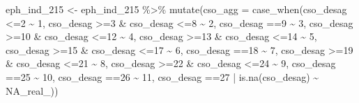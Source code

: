 \documentclass[
]{book}
\newenvironment{Shaded}{\begin{snugshade}}{\end{snugshade}}
\newcommand{\AttributeTok}[1]{\textcolor[rgb]{0.77,0.63,0.00}{#1}}
\newcommand{\ConstantTok}[1]{\textcolor[rgb]{0.00,0.00,0.00}{#1}}
\newcommand{\DecValTok}[1]{\textcolor[rgb]{0.00,0.00,0.81}{#1}}
\newcommand{\FunctionTok}[1]{\textcolor[rgb]{0.00,0.00,0.00}{#1}}
\newcommand{\NormalTok}[1]{#1}
\newcommand{\OtherTok}[1]{\textcolor[rgb]{0.56,0.35,0.01}{#1}}
\newcommand{\SpecialCharTok}[1]{\textcolor[rgb]{0.00,0.00,0.00}{#1}}
\begin{document}
\begin{Shaded}
\begin{Highlighting}[]
\NormalTok{eph\_ind\_215 }\OtherTok{\textless{}{-}}\NormalTok{ eph\_ind\_215 }\SpecialCharTok{\%\textgreater{}\%} 
  \FunctionTok{mutate}\NormalTok{(}\AttributeTok{cso\_agg =} \FunctionTok{case\_when}\NormalTok{(cso\_desag }\SpecialCharTok{\textless{}=}\DecValTok{2} \SpecialCharTok{\textasciitilde{}} \DecValTok{1}\NormalTok{,}
\NormalTok{                             cso\_desag }\SpecialCharTok{\textgreater{}=}\DecValTok{3} \SpecialCharTok{\&}\NormalTok{ cso\_desag }\SpecialCharTok{\textless{}=}\DecValTok{8} \SpecialCharTok{\textasciitilde{}} \DecValTok{2}\NormalTok{,}
\NormalTok{                             cso\_desag }\SpecialCharTok{==}\DecValTok{9} \SpecialCharTok{\textasciitilde{}} \DecValTok{3}\NormalTok{,}
\NormalTok{                             cso\_desag }\SpecialCharTok{\textgreater{}=}\DecValTok{10} \SpecialCharTok{\&}\NormalTok{ cso\_desag }\SpecialCharTok{\textless{}=}\DecValTok{12} \SpecialCharTok{\textasciitilde{}} \DecValTok{4}\NormalTok{,}
\NormalTok{                             cso\_desag }\SpecialCharTok{\textgreater{}=}\DecValTok{13} \SpecialCharTok{\&}\NormalTok{ cso\_desag }\SpecialCharTok{\textless{}=}\DecValTok{14} \SpecialCharTok{\textasciitilde{}} \DecValTok{5}\NormalTok{,}
\NormalTok{                             cso\_desag }\SpecialCharTok{\textgreater{}=}\DecValTok{15} \SpecialCharTok{\&}\NormalTok{ cso\_desag }\SpecialCharTok{\textless{}=}\DecValTok{17} \SpecialCharTok{\textasciitilde{}} \DecValTok{6}\NormalTok{,}
\NormalTok{                             cso\_desag }\SpecialCharTok{==}\DecValTok{18} \SpecialCharTok{\textasciitilde{}} \DecValTok{7}\NormalTok{,}
\NormalTok{                             cso\_desag }\SpecialCharTok{\textgreater{}=}\DecValTok{19} \SpecialCharTok{\&}\NormalTok{ cso\_desag }\SpecialCharTok{\textless{}=}\DecValTok{21} \SpecialCharTok{\textasciitilde{}} \DecValTok{8}\NormalTok{,}
\NormalTok{                             cso\_desag }\SpecialCharTok{\textgreater{}=}\DecValTok{22} \SpecialCharTok{\&}\NormalTok{ cso\_desag }\SpecialCharTok{\textless{}=}\DecValTok{24} \SpecialCharTok{\textasciitilde{}} \DecValTok{9}\NormalTok{,}
\NormalTok{                             cso\_desag }\SpecialCharTok{==}\DecValTok{25} \SpecialCharTok{\textasciitilde{}} \DecValTok{10}\NormalTok{,}
\NormalTok{                             cso\_desag }\SpecialCharTok{==}\DecValTok{26} \SpecialCharTok{\textasciitilde{}} \DecValTok{11}\NormalTok{,}
\NormalTok{                             cso\_desag }\SpecialCharTok{==}\DecValTok{27} \SpecialCharTok{|} \FunctionTok{is.na}\NormalTok{(cso\_desag) }\SpecialCharTok{\textasciitilde{}} \ConstantTok{NA\_real\_}\NormalTok{))}


\end{Highlighting}
\end{Shaded}
\end{document}
